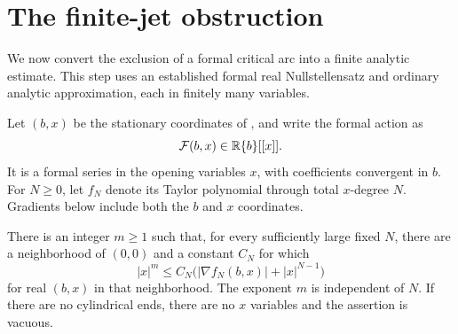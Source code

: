 \section{The finite-jet obstruction}\label{sec:finite-jet}
We now convert the exclusion of a formal critical arc into a finite analytic estimate. This step uses an established formal real Nullstellensatz and ordinary analytic approximation, each in finitely many variables.

Let $(b,x)$ be the stationary coordinates of , and write the formal action as
\[
 \mathcal F(b,x)\in\mathbb R\{b\}[[x]].
\]
It is a formal series in the opening variables $x$, with coefficients convergent in $b$. For $N\geq0$, let $f_N$ denote its Taylor polynomial through total $x$-degree $N$. Gradients below include both the $b$ and $x$ coordinates.

\begin{lemma}\label{jet:finite-power}
There is an integer $m\geq1$ such that, for every sufficiently large fixed $N$, there are a neighborhood of $(0,0)$ and a constant $C_N$ for which
\begin{equation}\label{jet:inequality}
 |x|^m\leq C_N\bigl(|\nabla f_N(b,x)|+|x|^{N-1}\bigr)
\end{equation}
for real $(b,x)$ in that neighborhood. The exponent $m$ is independent of $N$. If there are no cylindrical ends, there are no $x$ variables and the assertion is vacuous.
\end{lemma}

